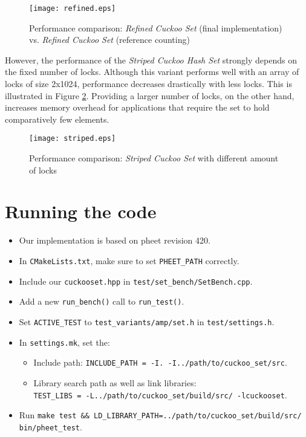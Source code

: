 \documentclass[a4paper,10pt]{article}
\begin{document}
\begin{figure}[H]
\begin{center}
\texttt{[image: refined.eps]}
\end{center}
\caption{Performance comparison: \emph{Refined Cuckoo Set} (final implementation) vs. \emph{Refined Cuckoo Set} (reference counting)}
\label{fig:plot4}
\end{figure}


However, the performance of the \emph{Striped Cuckoo Hash Set} strongly
depends on the fixed number of locks. Although this variant performs well
with an array of locks of size 2x1024, performance decreases drastically with
less locks. This is illustrated in Figure \ref{fig:plot3}. Providing a larger
number of locks, on the other hand, increases memory overhead for applications
that require the set to hold comparatively few elements.

\begin{figure}[H]
\begin{center}
\texttt{[image: striped.eps]}
\end{center}
\caption{Performance comparison: \emph{Striped Cuckoo Set} with different amount of locks}
\label{fig:plot3}
\end{figure}

\section{Running the code}
\begin{itemize}
\item Our implementation is based on pheet revision 420.
\item In \verb|CMakeLists.txt|, make sure to set \lstinline|PHEET_PATH| correctly.
\item Include our \verb|cuckooset.hpp| in \verb|test/set_bench/SetBench.cpp|.
\item Add a new \lstinline|run_bench()| call to \lstinline|run_test()|.
\item Set \lstinline|ACTIVE_TEST| to \verb|test_variants/amp/set.h| in \verb|test/settings.h|.
\item In \verb|settings.mk|, set the:
\begin{itemize}
\item Include path: \verb|INCLUDE_PATH = -I. -I../path/to/cuckoo_set/src|.
\item Library search path as well as link libraries: \\
      \verb|TEST_LIBS = -L../path/to/cuckoo_set/build/src/ -lcuckooset|.
\end{itemize}
\item Run \verb|make test && LD_LIBRARY_PATH=../path/to/cuckoo_set/build/src/ bin/pheet_test|.
\end{itemize}
\end{document}
